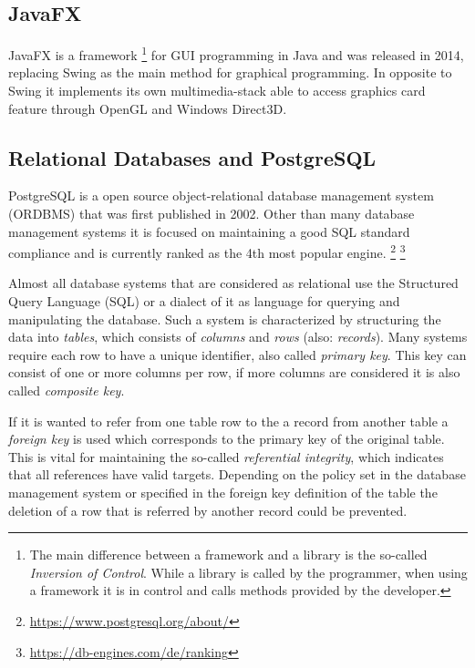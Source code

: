\subsection{JavaFX}

JavaFX is a framework \footnote{The main difference between a framework and a library is the so-called \emph{Inversion of Control}. While a library is called by the programmer, when using a framework it is in control and calls methods provided by the developer.} for GUI programming in Java and was released in 2014, replacing Swing as the main method for graphical programming. In opposite to Swing it implements its own multimedia-stack able to access graphics card feature through OpenGL and Windows Direct3D.  

\subsection{Relational Databases and PostgreSQL}

PostgreSQL is a open source object-relational database management system (ORDBMS) that was first published in 2002. Other than many database management systems it is focused on maintaining a good SQL standard compliance and is currently ranked as the 4th most popular engine. \footnote{ \href{https://www.postgresql.org/about/}{https://www.postgresql.org/about/}} \footnote{\href{https://db-engines.com/de/ranking}{https://db-engines.com/de/ranking}}

Almost all database systems that are considered as relational use the Structured Query Language (SQL) or a dialect of it as language for querying and manipulating the database. Such a system is characterized by structuring the data into \emph{tables}, which consists of \emph{columns} and \emph{rows} (also: \emph{records}). Many systems require each row to have a unique identifier, also called \emph{primary key}. This key can consist of one or more columns per row, if more columns are considered it is also called \emph{composite key}. 

If it is wanted to refer from one table row to the a record from another table a \emph{foreign key} is used which corresponds to the primary key of the original table. This is vital for maintaining the so-called \emph{referential integrity}, which indicates that all references have valid targets. Depending on the policy set in the database management system or specified in the foreign key definition of the table the deletion of a row that is referred by another record could be prevented.


